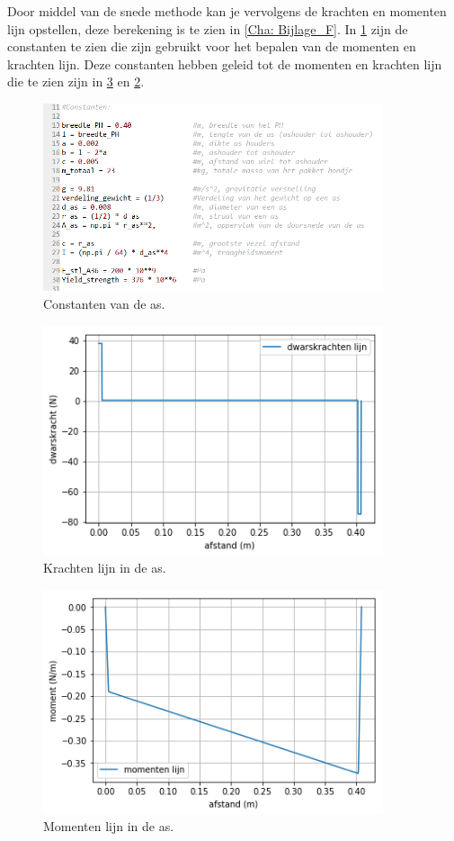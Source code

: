 Door middel van de snede methode kan je vervolgens de krachten en momenten lijn opstellen, deze berekening is te zien in \cref{Cha: Bijlage_F}. In \cref{fig: as_constanten} zijn de constanten te zien die zijn gebruikt voor het bepalen van de momenten en krachten lijn. Deze constanten hebben geleid tot de momenten en krachten lijn die te zien zijn in \cref{fig: Momentenlijn_as} en \cref{fig: Krachtenlijn_as}. \\

\begin{figure}[H]
    \includegraphics[width = 100mm]{04_conceptdimensionering/Constanten_as_goed.PNG}
    \caption{Constanten van de as.}
    \label{fig: as_constanten}
\end{figure}

\begin{figure}[H]
    \includegraphics[width = 100mm]{04_conceptdimensionering/Krachtenlijn_as.png}
    \caption{Krachten lijn in de as.}
    \label{fig: Krachtenlijn_as}
\end{figure}

\begin{figure}[H]
    \includegraphics[width = 100mm]{04_conceptdimensionering/Momentenlijn_as.png}
    \caption{Momenten lijn in de as.}
    \label{fig: Momentenlijn_as}
\end{figure}



